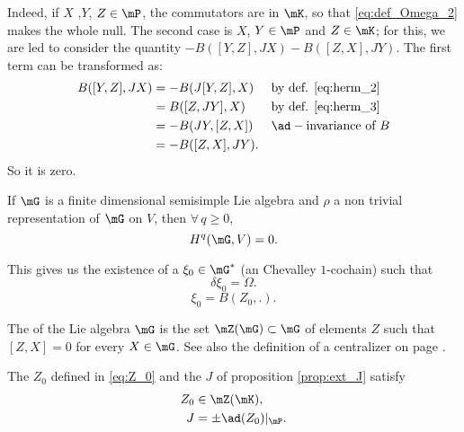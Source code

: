 Indeed, if $X$ ,$Y$, $Z\in\mP$, the commutators are in $\mK$, so that \eqref{eq:def_Omega_2} makes the whole null. The second case is $X$, $Y\in\mP$ and $Z\in\mK$; for this, we are led to consider the quantity $-B( [Y,Z],JX )-B([Z,X],JY)$. The first term can be transformed as:
\[
\begin{aligned}
  B([Y,Z],JX)&=-B(J[Y,Z],X)&&\text{by def. \eqref{eq:herm_2} } \\
             &=B([Z,JY],X)&&\text{by def.  \eqref{eq:herm_3}}\\
             &=-B(JY,[Z,X])&&\ad-\text{invariance of } B\\
	     &=-B([Z,X],JY).
\end{aligned}
\]
So it is zero.

\begin{lemma}
If $\mG$ is  a finite dimensional semisimple  Lie algebra and $\rho$ a non trivial representation of $\mG$ on $V$, then $\forall\,q\geq 0$,
\[
      H^q(\mG,V)=0.
\]
\end{lemma}

This gives us the existence of a $\xi_0\in\mG^*$ (an Chevalley $1$-cochain) such that 
\[
   \delta\xi_0=\Omega.
\]
\begin{equation}\label{eq:Z_0}
   \xi_0=B(Z_0,.).
\end{equation}

\begin{definition}
	The  of the Lie algebra $\mG$ is the set $\mZ(\mG)\subset\mG$ of elements $Z$ such that $[Z,X]=0$ for every $X\in\mG$. See also the definition of a centralizer on page \pageref{PgDefCentralisateur}.
\end{definition}

\begin{proposition}
The $Z_0$ defined in \eqref{eq:Z_0} and the $J$ of proposition \ref{prop:ext_J} satisfy
\begin{subequations}
\begin{align}
   Z_0&\in\mZ(\mK),\\
   J&=\pm\ad(Z_0)|_{\mP}.
\end{align}   
\end{subequations}


\end{proposition}

